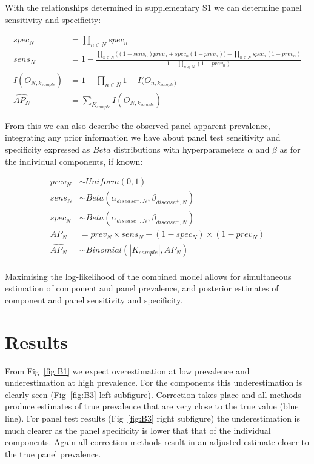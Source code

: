 \documentclass[a4paper, 12pt, twoside]{article}
\let\Oldsection\section
\renewcommand{\section}{\FloatBarrier\Oldsection}
\begin{document}
With the relationships determined in supplementary S1 we can determine panel sensitivity and specificity:

\begin{equation*}
\begin{aligned}
spec_N &= \prod_{n \in N}{spec_n} \\
sens_N &= 1-\frac{
  \prod_{n \in N}{\bigg((1-sens_n) prev_n + spec_n  (1-prev_n) \bigg) } - \prod_{n \in N}{spec_n (1-prev_n)}
}{
  1 - \prod_{n \in N}{ (1-prev_n)} %
} \\
I(O_{N,k_{sample}}) &= 1-\prod_{n \in N}{1-I(O_{n,k_{sample})}} \\
\widehat{AP_N} &= \sum_{K_{sample}}{I(O_{N,k_{sample}})}
\end{aligned}
\end{equation*}

From this we can also describe the observed panel apparent prevalence, integrating any prior information we have about panel test sensitivity and specificity expressed as \(Beta\) distributions with hyperparameters \(\alpha\) and \(\beta\) as for the individual components, if known:

\begin{equation*}
\begin{aligned}
prev_N &\sim Uniform(0,1) \\
sens_N &\sim Beta(\alpha_{disease^+,N}, \beta_{disease^+,N}) \\
spec_N &\sim Beta(\alpha_{disease^-,N}, \beta_{disease^-,N}) \\
AP_N &= prev_N \times sens_N + (1-spec_N) \times (1-prev_N) \\
\widehat{AP_N} &\sim Binomial(|K_{sample}|, AP_N) \\
\end{aligned}
\end{equation*}

Maximising the log-likelihood of the combined model allows for simultaneous estimation of component and panel prevalence, and posterior estimates of component and panel sensitivity and specificity.

\section{Results}

From Fig~\ref{fig:B1} we expect overestimation at low prevalence and underestimation at high prevalence. For the components this underestimation is clearly seen (Fig~\ref{fig:B3} left subfigure). Correction takes place and all methods produce estimates of true prevalence that are very close to the true value (blue line). For panel test results (Fig~\ref{fig:B3} right subfigure) the underestimation is much clearer as the panel specificity is lower that that of the individual components. Again all correction methods result in an adjusted estimate closer to the true panel prevalence.
\end{document}
